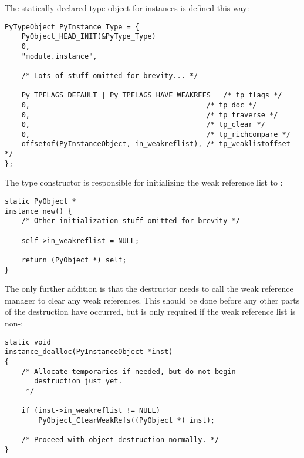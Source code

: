 The statically-declared type object for instances is defined this way:

\begin{verbatim}
PyTypeObject PyInstance_Type = {
    PyObject_HEAD_INIT(&PyType_Type)
    0,
    "module.instance",

    /* Lots of stuff omitted for brevity... */

    Py_TPFLAGS_DEFAULT | Py_TPFLAGS_HAVE_WEAKREFS   /* tp_flags */
    0,                                          /* tp_doc */
    0,                                          /* tp_traverse */
    0,                                          /* tp_clear */
    0,                                          /* tp_richcompare */
    offsetof(PyInstanceObject, in_weakreflist), /* tp_weaklistoffset */
};
\end{verbatim}

The type constructor is responsible for initializing the weak reference
list to \NULL{}:

\begin{verbatim}
static PyObject *
instance_new() {
    /* Other initialization stuff omitted for brevity */

    self->in_weakreflist = NULL;

    return (PyObject *) self;
}
\end{verbatim}

The only further addition is that the destructor needs to call the
weak reference manager to clear any weak references.  This should be
done before any other parts of the destruction have occurred, but is
only required if the weak reference list is non-\NULL{}:

\begin{verbatim}
static void
instance_dealloc(PyInstanceObject *inst)
{
    /* Allocate temporaries if needed, but do not begin
       destruction just yet.
     */

    if (inst->in_weakreflist != NULL)
        PyObject_ClearWeakRefs((PyObject *) inst);

    /* Proceed with object destruction normally. */
}
\end{verbatim}
